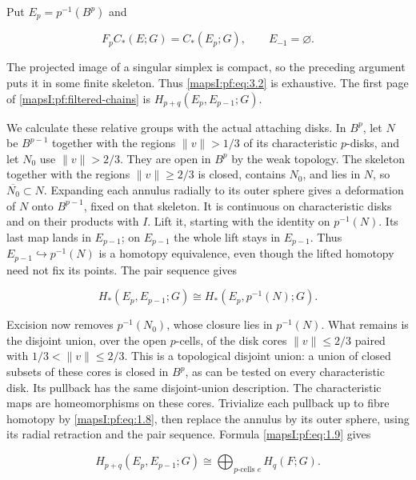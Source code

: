 \documentclass[11pt]{article}
\begin{document}
Put \(E_p=p^{-1}(B^p)\) and

\begin{equation}
F_pC_*(E;G)=C_*(E_p;G),\qquad E_{-1}=\varnothing.
\label{mapsI:pf:eq:3.2}
\end{equation}

The projected image of a singular simplex is compact, so the preceding argument puts it in some finite skeleton. Thus \eqref{mapsI:pf:eq:3.2} is exhaustive. The first page of \cref{mapsI:pf:filtered-chains} is \(H_{p+q}(E_p,E_{p-1};G)\).

We calculate these relative groups with the actual attaching disks. In \(B^p\), let \(N\) be \(B^{p-1}\) together with the regions \(\|v\|>1/3\) of its characteristic \(p\)-disks, and let \(N_0\) use \(\|v\|>2/3\). They are open in \(B^p\) by the weak topology. The skeleton together with the regions \(\|v\|\geq2/3\) is closed, contains \(N_0\), and lies in \(N\), so \(\overline{N_0}\subset N\). Expanding each annulus radially to its outer sphere gives a deformation of \(N\) onto \(B^{p-1}\), fixed on that skeleton. It is continuous on characteristic disks and on their products with \(I\). Lift it, starting with the identity on \(p^{-1}(N)\). Its last map lands in \(E_{p-1}\); on \(E_{p-1}\) the whole lift stays in \(E_{p-1}\). Thus \(E_{p-1}\hookrightarrow p^{-1}(N)\) is a homotopy equivalence, even though the lifted homotopy need not fix its points. The pair sequence gives

\begin{equation}
H_*(E_p,E_{p-1};G)\cong H_*(E_p,p^{-1}(N);G).
\label{mapsI:pf:eq:3.3}
\end{equation}

Excision now removes \(p^{-1}(N_0)\), whose closure lies in \(p^{-1}(N)\). What remains is the disjoint union, over the open \(p\)-cells, of the disk cores \(\|v\|\leq2/3\) paired with \(1/3<\|v\|\leq2/3\). This is a topological disjoint union: a union of closed subsets of these cores is closed in \(B^p\), as can be tested on every characteristic disk. Its pullback has the same disjoint-union description. The characteristic maps are homeomorphisms on these cores. Trivialize each pullback up to fibre homotopy by \eqref{mapsI:pf:eq:1.8}, then replace the annulus by its outer sphere, using its radial retraction and the pair sequence. Formula \eqref{mapsI:pf:eq:1.9} gives

\begin{equation}
H_{p+q}(E_p,E_{p-1};G)
\cong\bigoplus_{\text{\(p\)-cells }e}H_q(F;G).
\label{mapsI:pf:eq:3.4}
\end{equation}
\end{document}
